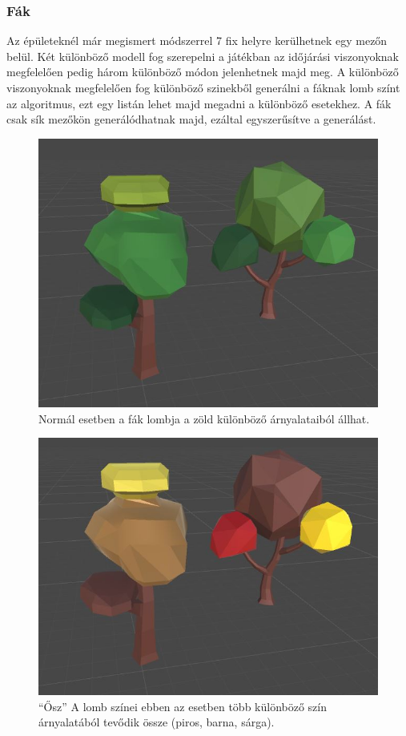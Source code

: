 \subsubsection{Fák}

Az épületeknél már megismert módszerrel 7 fix helyre kerülhetnek egy mezőn belül. Két különböző modell fog szerepelni a játékban az időjárási viszonyoknak megfelelően pedig három különböző módon jelenhetnek majd meg. A különböző viszonyoknak megfelelően fog különböző szinekből generálni a fáknak lomb színt az algoritmus, ezt egy listán lehet majd megadni a különböző esetekhez. A fák csak sík mezőkön generálódhatnak majd, ezáltal egyszerűsítve a generálást.

\begin{figure}[h!]
\centering
\includegraphics[scale=0.35]{kepek/Tree_Normal.JPG}
\caption{Normál esetben a fák lombja a zöld különböző árnyalataiból állhat.}
\label{fig:Tree_Normal}
\end{figure}

\begin{figure}[h!]
\centering
\includegraphics[scale=0.35]{kepek/Tree_Fall.JPG}
\caption{“Ősz” A lomb színei ebben az esetben több különböző szín árnyalatából tevődik össze (piros, barna, sárga).}
\label{fig:Tree_Fall}
\end{figure}


